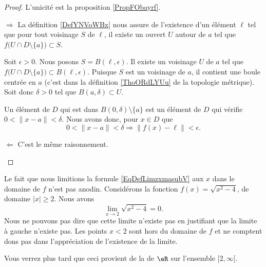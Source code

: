 \begin{proof}
    L'unicité est la proposition \ref{PropFObayrf}.

    \begin{subproof}
    \item[\( \Rightarrow\)]
        La définition \ref{DefYNVoWBx} nous assure de l'existence d'un élément \( \ell\) tel que pour tout voisinage \( S\) de \( \ell\), il existe un ouvert \( U\) autour de \( a\) tel que \( f\big( U\cap D\setminus\{ a \} \big)\subset S\).

        Soit \( \epsilon>0\). Nous posons \( S=B(\ell,\epsilon)\). Il existe un voisinage \( U\) de \( a\) tel que \( f\big( U\cap D\setminus\{ a \} \big)\subset B(\ell,\epsilon)\). Puisque \( S\) est un voisinage de \( a\), il contient une boule centrée en \( a\) (c'est dans la définition \ref{ThoORdLYUu} de la topologie métrique). Soit donc \( \delta>0\) tel que \( B(a,\delta)\subset U\).

        Un élément de \( D\) qui est dans \( B(0,\delta)\setminus \{ a \}\) est un élément de \( D\) qui vérifie \( 0<\| x-a \|<\delta\). Nous avons donc, pour \( x\in D\) que
        \begin{equation}
            0<\| x-a \|<\delta\Rightarrow \| f(x)-\ell \|<\epsilon.
        \end{equation}
    \item[\( \Leftarrow\)] C'est le même raisonnement.
    \end{subproof}
\end{proof}


\begin{remark}
    Le fait que nous limitions la formule \eqref{EqDefLimzxmasubV} aux \( x\) dans le domaine de \( f\) n'est pas anodin. Considérons la fonction \( f(x)=\sqrt{x^2-4}\), de domaine \( | x |\geq 2\). Nous avons
    \begin{equation}
        \lim_{x\to 2} \sqrt{x^2-4}=0.
    \end{equation}
    Nous ne pouvons pas dire que cette limite n'existe pas en justifiant que la limite à gauche n'existe pas. Les points \( x<2\) sont hors du domaine de \( f\) et ne comptent dons pas dans l'appréciation de l'existence de la limite.

    Vous verrez plus tard que ceci provient de la  de \( \eR\) sur l'ensemble \( \mathopen[ 2 , \infty [\).
\end{remark}

